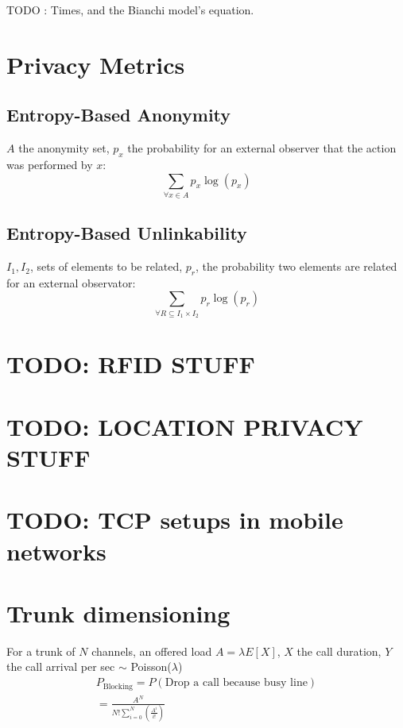\documentclass[11pt, a4paper,twocolumn]{scrartcl}
\begin{document}
TODO : Times, and the Bianchi model's equation.

\section{Privacy Metrics}

\subsection{Entropy-Based Anonymity}
$A$ the anonymity set, $p_x$ the probability for an external observer that the action was performed by $x$:
\begin{equation}
	\sum_{\forall x \in A} p_x \log(p_x)
\end{equation}

\subsection{Entropy-Based Unlinkability}
$I_1,I_2$, sets of elements to be related, $p_r$, the probability two elements are related for an external observator:
\begin{equation}
	\sum_{\forall R \subseteq I_1 \times I_2}p_r \log(p_r)
\end{equation}

\section{TODO: RFID STUFF}
\section{TODO: LOCATION PRIVACY STUFF}
\section{TODO: TCP setups in mobile networks}

\section{Trunk dimensioning}
For a trunk of $N$ channels, an offered load $A=\lambda E[X]$, $X$ the call duration, $Y$ the call arrival per sec $\sim$ Poisson($\lambda$) 
\begin{align}
	P_\textrm{Blocking} = P(\textrm{Drop a call because busy line})  \\
	= \frac{A^N}{N!\sum^N_{i=0}(\frac{A^i}{i!})}
\end{align}
\end{document}
